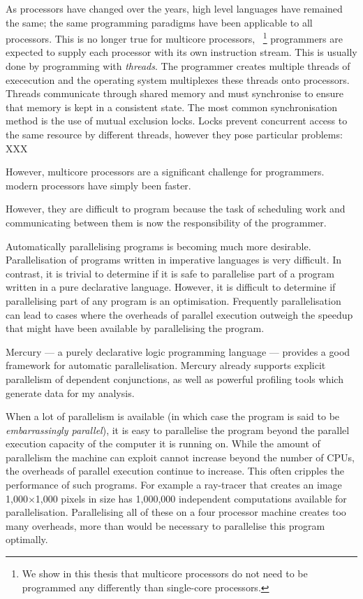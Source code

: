 
As processors have changed over the years,
high level languages have remained the same;
the same programming paradigms have been applicable to all processors.
This is no longer true for multicore processors,~%
\footnote{We show in this thesis that multicore processors do not need to be
programmed any differently than single-core processors.}
programmers are expected to supply each processor with its own instruction
stream.
This is usually done by programming with \emph{threads}.
The programmer creates multiple threads of exececution and the operating system
multiplexes these threads onto processors.
Threads communicate through shared memory and must synchronise to ensure that
memory is kept in a consistent state.
The most common synchronisation method is the use of mutual exclusion locks.
Locks prevent concurrent access to the same resource by different threads,
however they pose particular problems: XXX



However, multicore processors are a significant challenge for programmers.
modern processors have simply been faster.



However, they are difficult to program because the task of scheduling work and
communicating between them is now the responsibility of the programmer.



Automatically parallelising programs is becoming much more desirable.
Parallelisation of programs written in imperative languages is very
difficult.  In contrast, it is trivial to determine if it is safe to
parallelise part of a program written in a pure declarative language.
However, it is difficult to determine if parallelising part of any
program is an optimisation.  Frequently parallelisation can lead to
cases where the overheads of parallel execution outweigh the speedup
that might have been available by parallelising the program.

Mercury --- a purely declarative logic programming language ---
provides a good framework for automatic parallelisation.  Mercury
already supports explicit parallelism of dependent conjunctions, as
well as powerful profiling tools which generate data for my analysis.

When a lot of parallelism is available (in which case the program is said to
be \emph{embarrassingly parallel}), it is easy to parallelise the
program beyond the parallel execution capacity of the computer it is
running on.
While the amount of parallelism the machine can exploit
cannot increase beyond the number of CPUs,
the overheads of parallel execution continue to increase.
This often cripples the performance of such programs.
For example a ray-tracer that creates an image
1,000$\times$1,000 pixels in size has 1,000,000 independent computations
available for parallelisation.
Parallelising all of these on a four processor machine creates too
many overheads, more than would be necessary to parallelise this program
optimally.

